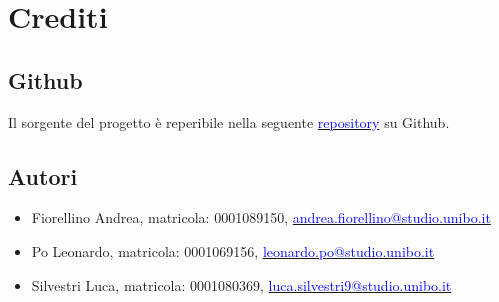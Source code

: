 \documentclass{article}
\begin{document}
\newpage
\section{Crediti}
\subsection{Github}
Il sorgente del progetto è reperibile nella seguente \href{https://github.com/aNdReA9111/PandOS.git}{\textcolor{blue}{repository}} su Github.

\subsection{Autori}
\begin{itemize}
    \item Fiorellino Andrea, matricola: 0001089150, \href{mailto:andrea.fiorellino@studio.unibo.it}{\textcolor{blue}{andrea.fiorellino@studio.unibo.it}}
    \item Po Leonardo, matricola: 0001069156, \href{mailto:leonardo.po@studio.unibo.it}{\textcolor{blue}{leonardo.po@studio.unibo.it}}
    \item Silvestri Luca, matricola: 0001080369, \href{mailto:luca.silvestri9@studio.unibo.it}{\textcolor{blue}{luca.silvestri9@studio.unibo.it}}
\end{itemize}
\end{document}

